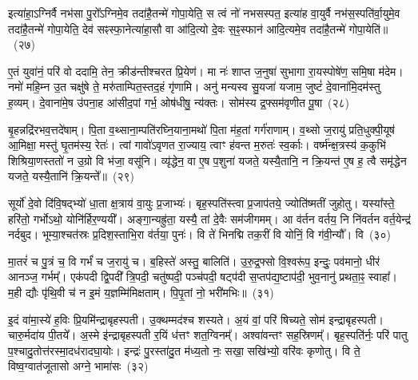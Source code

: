 इत्या॑हा॒\-ऽग्निर्वै नभ॑सा पु॒रो᳚\-ऽग्निमे॒व तदा॑है॒तन्मे॑ गोपा॒येति॒ स त्वं नो॑ नभसस्पत॒ इत्या॑ह वा॒युर्वै नभ॑स॒स्पति॑र्वा॒युमे॒व तदा॑है॒तन्मे॑ गोपा॒येति॒ देव॑ सꣴस्फा॒नेत्या॑हा॒सौ वा आ॑दि॒त्यो दे॒वः स॒ꣴ॒स्फान॑ आदि॒त्यमे॒व तदा॑है॒तन्मे॑ गोपा॒येति॑॥~(२७)

{\anuvakamend[{कुसी॑द॒न्त्वन्न॑ एनमोषे॒द्यदि॑ पु॒र आ॑दि॒त्यमे॒व तदा॑है॒तन्मे॑ गोपा॒येति॑}]}%

ए॒तं युवा॑नं॒ परि॑ वो ददामि॒ तेन॒ क्रीड॑न्तीश्चरत प्रि॒येण॑। मा नः॑ शाप्त ज॒नुषा॑ सुभागा रा॒यस्पोषे॑ण॒ समि॒षा म॑देम। नमो॑ महि॒म्न उ॒त चक्षु॑षे ते॒ मरु॑ताम्पित॒स्तद॒हं गृ॑णामि। अनु॑ मन्यस्व सु॒यजा॑ यजाम॒ जुष्टं॑ दे॒वाना॑मि॒दम॑स्तु ह॒व्यम्। दे॒वाना॑मे॒ष उ॑पना॒ह आ॑सीद॒पां गर्भ॒ ओष॑धीषु॒ न्य॑क्तः। सोम॑स्य द्र॒फ्सम॑वृणीत पू॒षा~(२८)

बृ॒हन्नद्रि॑रभव॒त्तदे॑षाम्। पि॒ता व॒थ्साना॒म्पति॑रघ्नि॒याना॒मथो॑ पि॒ता म॑ह॒तां गर्ग॑राणाम्। व॒थ्सो ज॒रायु॑ प्रति॒धुक्पी॒यूष॑ आ॒मिक्षा॒ मस्तु॑ घृ॒तम॑स्य॒ रेतः॑। त्वां गावो॑\-ऽवृणत रा॒ज्याय॒ त्वाꣳ ह॑वन्त म॒रुतः॑ स्व॒र्काः। वर्ष्म॑न्क्ष॒त्रस्य॑ क॒कुभि॑ शिश्रिया॒णस्ततो॑ न उ॒ग्रो वि भ॑जा॒ वसू॑नि। व्यृ॑द्धेन॒ वा ए॒ष प॒शुना॑ यजते॒ यस्यै॒तानि॒ न क्रि॒यन्त॑ ए॒ष ह॒ त्वै समृ॑द्धेन यजते॒ यस्यै॒तानि॑ क्रि॒यन्ते᳚॥~(२९)

{\anuvakamend[{पू॒षा क्रि॒यन्त॑ ए॒षो᳚\-ऽष्टौ च॑}]}%

सूर्यो॑ दे॒वो दि॑वि॒षद्भ्यो॑ धा॒ता क्ष॒त्राय॑ वा॒युः प्र॒जाभ्यः॑। बृह॒स्पति॑स्त्वा प्र॒जाप॑तये॒ ज्योति॑ष्मतीं जुहोतु। यस्या᳚स्ते॒ हरि॑तो॒ गर्भो\-ऽथो॒ योनि॑र्\mbox{}हिर॒ण्ययी᳚। अङ्गा॒न्यह्रु॑ता॒ यस्यै॒ तां दे॒वैः सम॑जीगमम्। आ व॑र्तन वर्तय॒ नि नि॑वर्तन वर्त॒येन्द्र॑ नर्दबुद। भूम्या॒श्चत॑स्रः प्र॒दिश॒स्ताभि॒रा व॑र्तया॒ पुनः॑। वि ते॑ भिनद्मि तक॒रीं वि योनिं॒ वि ग॑वी॒न्यौ᳚। वि~(३०)

मा॒तरं॑ च पु॒त्रं च॒ वि गर्भं॑ च ज॒रायु॑ च। ब॒हिस्ते॑ अस्तु॒ बालिति॑। उ॒रु॒द्र॒फ्सो वि॒श्वरू॑प॒ इन्दुः॒ पव॑मानो॒ धीर॑ आनञ्ज॒ गर्भम्᳚। एक॑पदी द्वि॒पदी᳚ त्रि॒पदी॒ चतु॑ष्पदी॒ पञ्च॑पदी॒ षट्प॑दी स॒प्तप॑द्य॒ष्टाप॑दी॒ भुव॒नानु॑ प्रथता॒ꣴ॒ स्वाहा᳚। म॒ही द्यौः पृ॑थि॒वी च॑ न इ॒मं य॒ज्ञम्मि॑मिक्षताम्। पि॒पृ॒तां नो॒ भरी॑मभिः॥~(३१)

{\anuvakamend[{ग॒वी॒न्यौ॑ वि चतु॑श्चत्वारिꣳशच्च}]}%

इ॒दं वा॑मा॒स्ये॑ ह॒विः प्रि॒यमि॑न्द्राबृहस्पती। उ॒क्थम्मद॑श्च शस्यते। अ॒यं वां॒ परि॑ षिच्यते॒ सोम॑ इन्द्राबृहस्पती। चारु॒र्मदा॑य पी॒तये᳚। अ॒स्मे इ॑न्द्राबृहस्पती र॒यिं ध॑त्तꣳ शत॒ग्विनम्᳚। अश्वा॑वन्तꣳ सह॒स्रिणम्᳚। बृह॒स्पति॑र्नः॒ परि॑ पातु प॒श्चादु॒तोत्त॑रस्मा॒दध॑रादघा॒योः। इन्द्रः॑ पु॒रस्ता॑दु॒त म॑ध्य॒तो नः॒ सखा॒ सखि॑भ्यो॒ वरि॑वः कृणोतु। वि ते॒ विष्व॒ग्वात॑जूतासो अग्ने॒ भामा॑सः~(३२)

